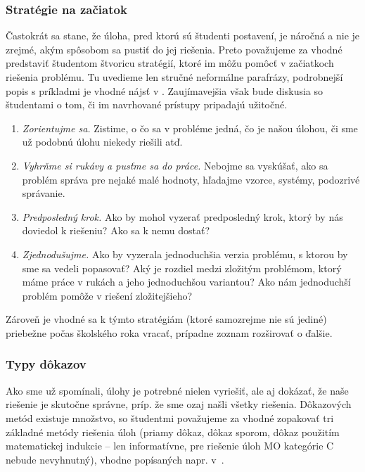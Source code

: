 {\subsubsection*{Stratégie na začiatok}

Častokrát sa stane, že úloha, pred ktorú sú študenti postavení, je náročná a nie je zrejmé, akým spôsobom sa pustiť do jej riešenia. Preto považujeme za vhodné predstaviť študentom štvoricu stratégií, ktoré im môžu pomôcť v začiatkoch riešenia problému. Tu uvedieme len stručné neformálne parafrázy, podrobnejší popis s príkladmi je vhodné nájsť v \cite{zeitz2007}. Zaujímavejšia však bude diskusia so študentami o tom, či im navrhované prístupy pripadajú užitočné. 
\begin{enumerate}
\item \textit{Zorientujme sa.} Zistime, o čo sa v probléme jedná, čo je našou úlohou, či sme už podobnú úlohu niekedy riešili atď.
\item \textit{Vyhrňme si rukávy a pusťme sa do práce.} Nebojme sa vyskúšať, ako sa problém správa pre nejaké malé hodnoty, hľadajme vzorce, systémy, podozrivé správanie.
\item \textit{Predposledný krok.} Ako by mohol vyzerať predposledný krok, ktorý by nás doviedol k riešeniu? Ako sa k nemu dostať? 
\item \textit{Zjednodušujme.} Ako by vyzerala jednoduchšia verzia problému, s ktorou by sme sa vedeli popasovať? Aký je rozdiel medzi zložitým problémom, ktorý máme práce v rukách a jeho jednoduchšou variantou? Ako nám jednoduchší problém pomôže v riešení zložitejšieho?
\end{enumerate}

Zároveň je vhodné sa k týmto stratégiám (ktoré samozrejme nie sú jediné) priebežne počas školského roka vracať, prípadne zoznam rozširovať o ďalšie.


\subsubsection*{Typy dôkazov}

Ako sme už spomínali, úlohy je potrebné nielen vyriešiť, ale aj dokázať, že naše riešenie je skutočne správne, príp. že sme ozaj našli všetky riešenia. Dôkazových metód existuje množstvo, so študentmi považujeme za vhodné zopakovať tri základné metódy riešenia úloh (priamy dôkaz, dôkaz sporom, dôkaz použitím matematickej indukcie -- len informatívne, pre riešenie úloh MO kategórie C nebude nevyhnutný), vhodne popísaných napr. v~\cite{polak2014}.

}

